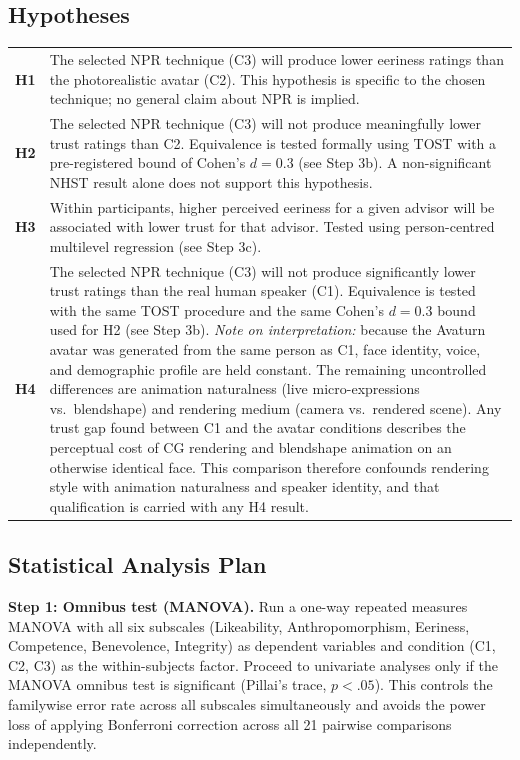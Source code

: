 \documentclass[11pt, a4paper]{article}
\begin{document}
\subsection{Hypotheses}

\begin{tabular}{@{}lp{11cm}@{}}
\toprule
\textbf{H1} & The selected NPR technique (C3) will produce lower eeriness ratings than the photorealistic avatar (C2). This hypothesis is specific to the chosen technique; no general claim about NPR is implied. \\[3pt]
\textbf{H2} & The selected NPR technique (C3) will not produce meaningfully lower trust ratings than C2. Equivalence is tested formally using TOST with a pre-registered bound of Cohen's $d = 0.3$ (see Step 3b). A non-significant NHST result alone does not support this hypothesis. \\[3pt]
\textbf{H3} & Within participants, higher perceived eeriness for a given advisor will be associated with lower trust for that advisor. Tested using person-centred multilevel regression (see Step 3c). \\[3pt]
\textbf{H4} & The selected NPR technique (C3) will not produce significantly lower trust ratings than the real human speaker (C1). Equivalence is tested with the same TOST procedure and the same Cohen's $d = 0.3$ bound used for H2 (see Step 3b). \textit{Note on interpretation:} because the Avaturn avatar was generated from the same person as C1, face identity, voice, and demographic profile are held constant. The remaining uncontrolled differences are animation naturalness (live micro-expressions vs.\ blendshape) and rendering medium (camera vs.\ rendered scene). Any trust gap found between C1 and the avatar conditions describes the perceptual cost of CG rendering and blendshape animation on an otherwise identical face. This comparison therefore confounds rendering style with animation naturalness and speaker identity, and that qualification is carried with any H4 result. \\
\bottomrule
\end{tabular}

\subsection{Statistical Analysis Plan}

\textbf{Step 1: Omnibus test (MANOVA).} Run a one-way repeated measures MANOVA with all six subscales (Likeability, Anthropomorphism, Eeriness, Competence, Benevolence, Integrity) as dependent variables and condition (C1, C2, C3) as the within-subjects factor. Proceed to univariate analyses only if the MANOVA omnibus test is significant (Pillai's trace, $p < .05$). This controls the familywise error rate across all subscales simultaneously and avoids the power loss of applying Bonferroni correction across all 21 pairwise comparisons independently.
\end{document}
